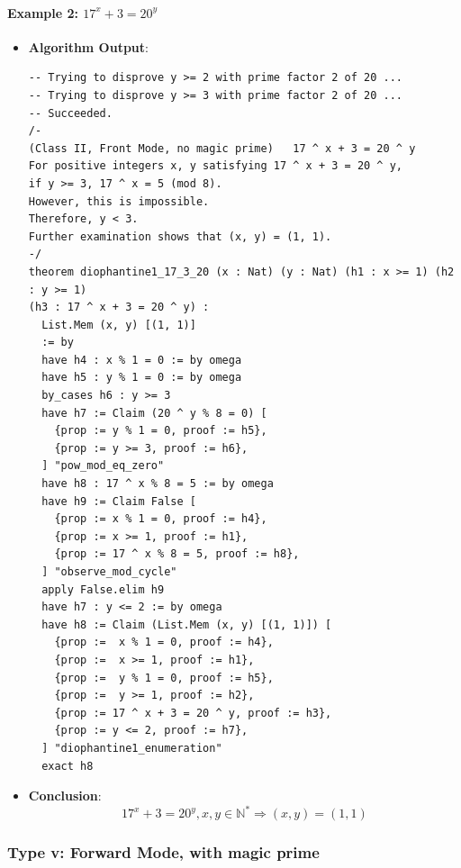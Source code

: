 \documentclass{article}
\begin{document}
\paragraph{Example 2: $17^x+3=20^y$}
\begin{itemize}
\item \textbf{Algorithm Output}:
    \begin{verbatim}
-- Trying to disprove y >= 2 with prime factor 2 of 20 ...
-- Trying to disprove y >= 3 with prime factor 2 of 20 ...
-- Succeeded.
/-
(Class II, Front Mode, no magic prime)   17 ^ x + 3 = 20 ^ y
For positive integers x, y satisfying 17 ^ x + 3 = 20 ^ y,
if y >= 3, 17 ^ x = 5 (mod 8).
However, this is impossible.
Therefore, y < 3.
Further examination shows that (x, y) = (1, 1).
-/
theorem diophantine1_17_3_20 (x : Nat) (y : Nat) (h1 : x >= 1) (h2 : y >= 1) 
(h3 : 17 ^ x + 3 = 20 ^ y) :  
  List.Mem (x, y) [(1, 1)]
  := by
  have h4 : x % 1 = 0 := by omega
  have h5 : y % 1 = 0 := by omega
  by_cases h6 : y >= 3
  have h7 := Claim (20 ^ y % 8 = 0) [
    {prop := y % 1 = 0, proof := h5},
    {prop := y >= 3, proof := h6},
  ] "pow_mod_eq_zero"
  have h8 : 17 ^ x % 8 = 5 := by omega
  have h9 := Claim False [
    {prop := x % 1 = 0, proof := h4},
    {prop := x >= 1, proof := h1},
    {prop := 17 ^ x % 8 = 5, proof := h8},
  ] "observe_mod_cycle"
  apply False.elim h9
  have h7 : y <= 2 := by omega
  have h8 := Claim (List.Mem (x, y) [(1, 1)]) [
    {prop :=  x % 1 = 0, proof := h4},
    {prop :=  x >= 1, proof := h1},
    {prop :=  y % 1 = 0, proof := h5},
    {prop :=  y >= 1, proof := h2},
    {prop := 17 ^ x + 3 = 20 ^ y, proof := h3},
    {prop := y <= 2, proof := h7},
  ] "diophantine1_enumeration"
  exact h8
    \end{verbatim}
    \item \textbf{Conclusion}:
    \[ 17^x+3=20^y, x, y \in \mathbb{N}^* \Rightarrow (x,y)=(1,1) \]
\end{itemize}

\subsubsection{Type v: Forward Mode, with magic prime}
\end{document}
